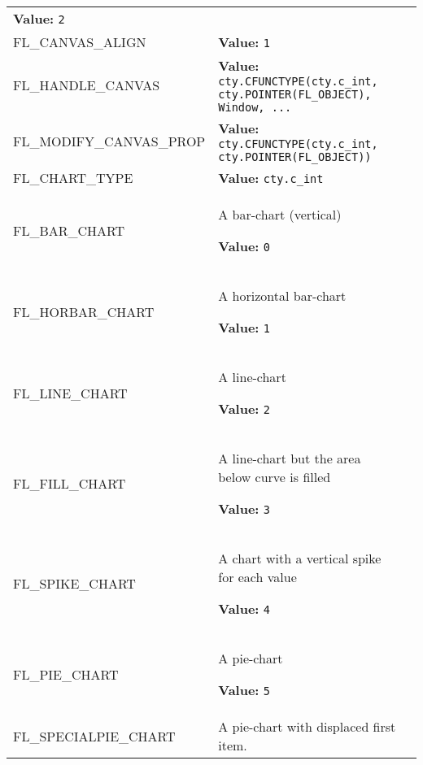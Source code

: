 \begin{longtable}{|p{\varnamewidth}|p{\vardescrwidth}|l}
\textbf{Value:} 
{\tt 2}&\\
\cline{1-2}
\raggedright F\-L\-\_\-C\-A\-N\-V\-A\-S\-\_\-A\-L\-I\-G\-N\- & \raggedright \textbf{Value:} 
{\tt 1}&\\
\cline{1-2}
\raggedright F\-L\-\_\-H\-A\-N\-D\-L\-E\-\_\-C\-A\-N\-V\-A\-S\- & \raggedright \textbf{Value:} 
{\tt cty.CFUNCTYPE(cty.c\_int, cty.POINTER(FL\_OBJECT), Window, \texttt{...}}&\\
\cline{1-2}
\raggedright F\-L\-\_\-M\-O\-D\-I\-F\-Y\-\_\-C\-A\-N\-V\-A\-S\-\_\-P\-R\-O\-P\- & \raggedright \textbf{Value:} 
{\tt cty.CFUNCTYPE(cty.c\_int, cty.POINTER(FL\_OBJECT))}&\\
\cline{1-2}
\raggedright F\-L\-\_\-C\-H\-A\-R\-T\-\_\-T\-Y\-P\-E\- & \raggedright \textbf{Value:} 
{\tt cty.c\_int}&\\
\cline{1-2}
\raggedright F\-L\-\_\-B\-A\-R\-\_\-C\-H\-A\-R\-T\- & \raggedright A bar-chart (vertical)

\textbf{Value:} 
{\tt 0}&\\
\cline{1-2}
\raggedright F\-L\-\_\-H\-O\-R\-B\-A\-R\-\_\-C\-H\-A\-R\-T\- & \raggedright A horizontal bar-chart

\textbf{Value:} 
{\tt 1}&\\
\cline{1-2}
\raggedright F\-L\-\_\-L\-I\-N\-E\-\_\-C\-H\-A\-R\-T\- & \raggedright A line-chart

\textbf{Value:} 
{\tt 2}&\\
\cline{1-2}
\raggedright F\-L\-\_\-F\-I\-L\-L\-\_\-C\-H\-A\-R\-T\- & \raggedright A line-chart but the area below curve is filled

\textbf{Value:} 
{\tt 3}&\\
\cline{1-2}
\raggedright F\-L\-\_\-S\-P\-I\-K\-E\-\_\-C\-H\-A\-R\-T\- & \raggedright A chart with a vertical spike for each value

\textbf{Value:} 
{\tt 4}&\\
\cline{1-2}
\raggedright F\-L\-\_\-P\-I\-E\-\_\-C\-H\-A\-R\-T\- & \raggedright A pie-chart

\textbf{Value:} 
{\tt 5}&\\
\cline{1-2}
\raggedright F\-L\-\_\-S\-P\-E\-C\-I\-A\-L\-P\-I\-E\-\_\-C\-H\-A\-R\-T\- & \raggedright A pie-chart with displaced first item.


\end{longtable}
